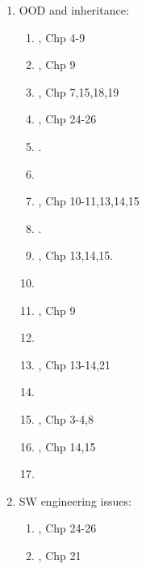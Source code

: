 \begin{enumerate}
\begin{enumerate}
	\item 
	\item 
	\item 
	\item 
	\item 
	\item 
	\item 
	\end{enumerate}
\item OOD and inheritance: \vspace{-0.3cm}
	\begin{enumerate} \itemsep -2pt
	\item \cite{Gregoire2014}, Chp 4-9
	\item \cite{Stroustrup2014}, Chp 9
	\item \cite{Lippman2013}, Chp 7,15,18,19
	\item \cite{Allain2012}, Chp 24-26
	\item \cite[Chp. 13--15; Appendices E and J]{Gaddis2012}.
	\item \cite[Chp. 9--10, 389--479]{Horstmann2012}
	\item \cite{Prata2012}, Chp 10-11,13,14,15
	\item \cite[Chp. 7, 11, 15; Appendices A, D, J, and K]{Gaddis2011}.
	\item \cite{Gaddis2010}, Chp 13,14,15.
	\item \cite[Chp. 10; \S12.1, 696--711; Chp. 15; Chp. 17]{Savitch2009}
	\item \cite{Stroustrup2009}, Chp 9
	\item \cite[Chp. 10--14, pp. 445--786]{Prata2005}
	\item \cite{Oualline2003}, Chp 13-14,21
	\item \cite[pp. 6--8; Chp. 11--12, pp. 245--298; Chp. 14--15, pp. 331--373]{Schildt2003a}
	\item \cite{Vermeir2001}, Chp 3-4,8
	\item \cite{Eckel2000}, Chp 14,15
	\item \cite[Chp. 11--12, pp. 255--325; Chp. 16--17, pp. 419--460]{Schildt1998a}
	\end{enumerate}
\item SW engineering issues: \vspace{-0.3cm}
	\begin{enumerate} \itemsep -2pt
	\item \cite{Gregoire2014}, Chp 24-26
	\item \cite{Allain2012}, Chp 21

\end{enumerate}
\end{enumerate}
